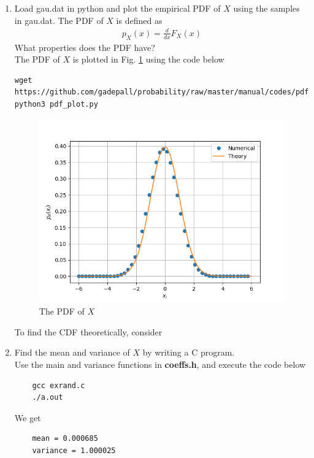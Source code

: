 \documentclass[journal,12pt,twocolumn]{IEEEtran}
\renewcommand\thesection{\arabic{section}}
\begin{document}
\begin{enumerate}[label=\thesection.\arabic*
,ref=\thesection.\theenumi]
\item
Load gau.dat in python and plot the empirical PDF of $X$ using the samples in gau.dat. The PDF of $X$ is defined as
\begin{align}
p_{X}(x) = \frac{d}{dx}F_{X}(x)
\end{align}
What properties does the PDF have?
\\
\solution The PDF of $X$ is plotted in Fig. \ref{fig:gauss_pdf} using the code below
\begin{lstlisting}
wget https://github.com/gadepall/probability/raw/master/manual/codes/pdf_plot.py
python3 pdf_plot.py
\end{lstlisting}

\begin{figure}
\centering
\includegraphics[width=\columnwidth]{./figures/PDF_gau.png}
\caption{The PDF of $X$}
\label{fig:gauss_pdf}
\end{figure}

To find the CDF theoretically, consider




\item Find the mean and variance of $X$ by writing a C program.
\\
\solution Use the main and variance functions in \textbf{coeffs.h}, and execute the code below
\begin{lstlisting}
    gcc exrand.c
    ./a.out
\end{lstlisting}
We get
\begin{lstlisting}
    mean = 0.000685
    variance = 1.000025
\end{lstlisting}



\end{enumerate}
\end{document}
